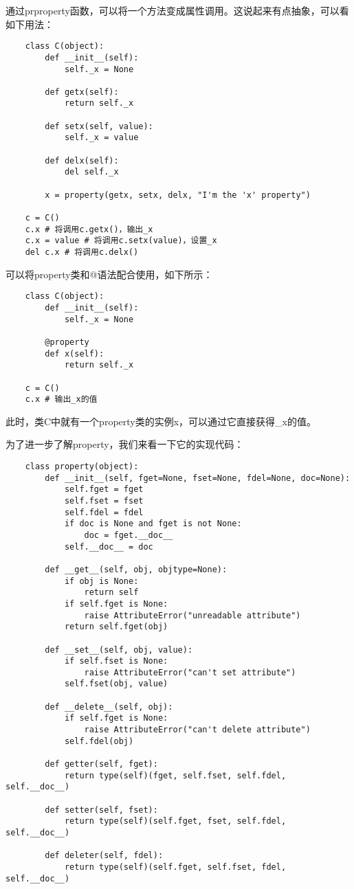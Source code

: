 \documentclass[a4paper,left=2.5cm,right=2.5cm,11pt]{article}
\begin{document}
	通过prproperty函数，可以将一个方法变成属性调用。这说起来有点抽象，可以看如下用法：
	\begin{lstlisting}
	class C(object):
		def __init__(self):
			self._x = None

		def getx(self):
			return self._x

		def setx(self, value):
			self._x = value

		def delx(self):
			del self._x

		x = property(getx, setx, delx, "I'm the 'x' property")
		
	c = C()
	c.x # 将调用c.getx()，输出_x
	c.x = value # 将调用c.setx(value)，设置_x
	del c.x # 将调用c.delx()
	\end{lstlisting}

	可以将property类和@语法配合使用，如下所示：
	\begin{lstlisting}
	class C(object):
		def __init__(self):
			self._x = None

		@property
		def x(self):
			return self._x

	c = C()
	c.x # 输出_x的值
	\end{lstlisting}

	此时，类C中就有一个property类的实例x，可以通过它直接获得\_x的值。\par

	为了进一步了解property，我们来看一下它的实现代码：
	\begin{lstlisting}
	class property(object):
		def __init__(self, fget=None, fset=None, fdel=None, doc=None):
			self.fget = fget
			self.fset = fset
			self.fdel = fdel
			if doc is None and fget is not None:
				doc = fget.__doc__
			self.__doc__ = doc

		def __get__(self, obj, objtype=None):
			if obj is None:
				return self
			if self.fget is None:
				raise AttributeError("unreadable attribute")
			return self.fget(obj)

		def __set__(self, obj, value):
			if self.fset is None:
				raise AttributeError("can't set attribute")
			self.fset(obj, value)

		def __delete__(self, obj):
			if self.fget is None:
				raise AttributeError("can't delete attribute")
			self.fdel(obj)

		def getter(self, fget):
			return type(self)(fget, self.fset, self.fdel, self.__doc__)

		def setter(self, fset):
			return type(self)(self.fget, fset, self.fdel, self.__doc__)

		def deleter(self, fdel):
			return type(self)(self.fget, self.fset, fdel, self.__doc__)
	\end{lstlisting}
\end{document}
